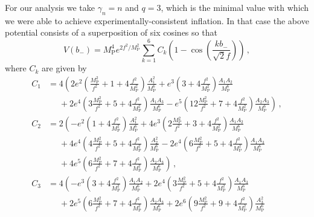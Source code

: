 \documentclass[12pt]{article}
\begin{document}
For our analysis we take $\gamma_n = n$ and $q = 3$, which is the minimal value with which we were able to achieve experimentally-consistent inflation.
In that case the above potential consists of a superposition of six cosines so that
\begin{equation} \label{eq:supergravity:Vslow3}
  V\left(b_-\right)
    = M_\text{P}^4 e^{2 f^2 / M_\text{P}^2} \sum_{k = 1}^6 C_k \left(1 - \cos\left(\frac{k b_-}{\sqrt{2} f}\right)\right)\,,
\end{equation}
where $C_k$ are given by
\begin{equation} \label{eq:supergravity:Vslow3Coefficients}
  \begin{aligned}
    C_1 &=   4 \left(
        2 e^2 \left(   \frac{M_\text{P}^2}{f^2} + 1 + 4 \frac{f^2}{M_\text{P}^2}\right) \frac{A_1^2  }{M_\text{P}^6}
      +   e^3 \left(                              3 + 4 \frac{f^2}{M_\text{P}^2}\right) \frac{A_1 A_2}{M_\text{P}^6}\right.\\
      &~~~~~~ \left.{}
      + 2 e^4 \left( 3 \frac{M_\text{P}^2}{f^2} + 5 + 4 \frac{f^2}{M_\text{P}^2}\right) \frac{A_1 A_3}{M_\text{P}^6}
      -   e^5 \left(12 \frac{M_\text{P}^2}{f^2} + 7 + 4 \frac{f^2}{M_\text{P}^2}\right) \frac{A_2 A_3}{M_\text{P}^6}
    \right)\,,\\
    C_2 &=   2 \left(
      -   e^2 \left(                              1 + 4 \frac{f^2}{M_\text{P}^2}\right) \frac{A_1^2  }{M_\text{P}^6}
      + 4 e^3 \left( 2 \frac{M_\text{P}^2}{f^2} + 3 + 4 \frac{f^2}{M_\text{P}^2}\right) \frac{A_1 A_2}{M_\text{P}^6}\right.\\
      &~~~~~~ \left.{}
      + 4 e^4 \left( 4 \frac{M_\text{P}^2}{f^2} + 5 + 4 \frac{f^2}{M_\text{P}^2}\right) \frac{A_2^2  }{M_\text{P}^6}
      - 2 e^4 \left( 6 \frac{M_\text{P}^2}{f^2} + 5 + 4 \frac{f^2}{M_\text{P}^2}\right) \frac{A_1 A_3}{M_\text{P}^6}\right.\\
      &~~~~~~ \left.{}
      + 4 e^5 \left( 6 \frac{M_\text{P}^2}{f^2} + 7 + 4 \frac{f^2}{M_\text{P}^2}\right) \frac{A_2 A_3}{M_\text{P}^6}
    \right)\,,\\
    C_3 &=   4 \left(
      -   e^3 \left(                              3 + 4 \frac{f^2}{M_\text{P}^2}\right) \frac{A_1 A_2}{M_\text{P}^6}
      + 2 e^4 \left( 3 \frac{M_\text{P}^2}{f^2} + 5 + 4 \frac{f^2}{M_\text{P}^2}\right) \frac{A_1 A_3}{M_\text{P}^6}\right.\\
      &~~~~~~ \left.{}
      + 2 e^5 \left( 6 \frac{M_\text{P}^2}{f^2} + 7 + 4 \frac{f^2}{M_\text{P}^2}\right) \frac{A_2 A_3}{M_\text{P}^6}
      + 2 e^6 \left( 9 \frac{M_\text{P}^2}{f^2} + 9 + 4 \frac{f^2}{M_\text{P}^2}\right) \frac{A_3^2  }{M_\text{P}^6}

\end{aligned}
\end{equation}
\end{document}
